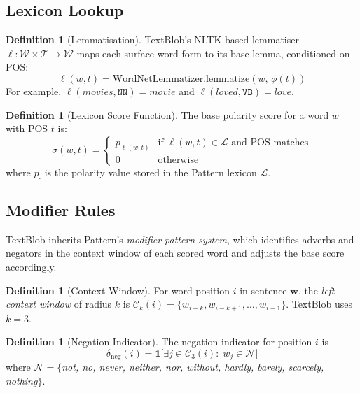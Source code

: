 \documentclass[12pt,a4paper]{article}
\theoremstyle{plain}
\theoremstyle{definition}
\newtheorem{definition}[theorem]{Definition}
\begin{document}
\subsection{Lexicon Lookup}

\begin{definition}[Lemmatisation]
\label{def:lemma}
  TextBlob's NLTK-based lemmatiser $\ell : \mathcal{W} \times
  \mathcal{T} \to \mathcal{W}$ maps each surface word form to its
  base lemma, conditioned on POS:
  \[
    \ell(w, t) =
    \text{WordNetLemmatizer.lemmatize}(w,\, \phi(t))
  \]
  For example, $\ell(\textit{movies}, \texttt{NN}) = \textit{movie}$
  and $\ell(\textit{loved}, \texttt{VB}) = \textit{love}$.
\end{definition}

\begin{definition}[Lexicon Score Function]
\label{def:lexlookup}
  The base polarity score for a word $w$ with POS $t$ is:
  \[
    \sigma(w, t) =
    \begin{cases}
      p_{\ell(w,t)} & \text{if } \ell(w,t) \in \mathcal{L}
                       \text{ and POS matches} \\
      0             & \text{otherwise}
    \end{cases}
  \]
  where $p_{\cdot}$ is the polarity value stored in the Pattern lexicon
  $\mathcal{L}$.
\end{definition}

\subsection{Modifier Rules}

TextBlob inherits Pattern's \emph{modifier pattern system}, which
identifies adverbs and negators in the context window of each scored
word and adjusts the base score accordingly.

\begin{definition}[Context Window]
\label{def:window}
  For word position $i$ in sentence $\mathbf{w}$, the \emph{left
  context window} of radius $k$ is
  $\mathcal{C}_k(i) = \{w_{i-k}, w_{i-k+1}, \ldots, w_{i-1}\}$.
  TextBlob uses $k=3$.
\end{definition}

\begin{definition}[Negation Indicator]
\label{def:negation}
  The negation indicator for position $i$ is
  \[
    \delta_{\text{neg}}(i) =
    \mathbf{1}\bigl[\exists j \in \mathcal{C}_3(i):\;
      w_j \in \mathcal{N}\bigr]
  \]
  where $\mathcal{N} = \{$\textit{not, no, never, neither, nor,
  without, hardly, barely, scarcely, nothing}$\}$.
\end{definition}
\end{document}
